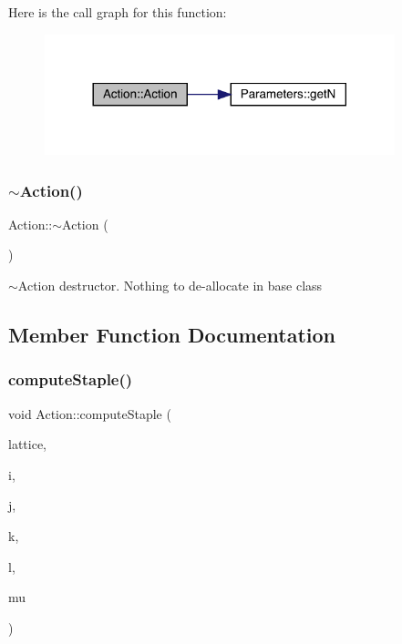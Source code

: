 Here is the call graph for this function\+:\nopagebreak
\begin{figure}[H]
\begin{center}
\leavevmode
\includegraphics[width=288pt]{class_action_a4f457ccfc8336b565cadca56b36e0271_cgraph}
\end{center}
\end{figure}
\mbox{\label{class_action_acdb06775d157339256a8ecd55749226c}} 
\subsubsection{\texorpdfstring{$\sim$Action()}{~Action()}}
{\footnotesize\ttfamily Action\+::$\sim$\+Action (\begin{DoxyParamCaption}{ }\end{DoxyParamCaption})\hspace{0.3cm}{\ttfamily [virtual]}}



$\sim$\+Action destructor. Nothing to de-\/allocate in base class 



\subsection{Member Function Documentation}
\mbox{\label{class_action_a2d5a64b47a8913955e5911ca072ff80d}} 
\subsubsection{\texorpdfstring{computeStaple()}{computeStaple()}}
{\footnotesize\ttfamily void Action\+::compute\+Staple (\begin{DoxyParamCaption}\item[{\mbox{\hyperlink{class_lattice}{Lattice}}$<$ \mbox{\hyperlink{class_s_u3}{S\+U3}} $>$ $\ast$}]{lattice,  }\item[{unsigned int}]{i,  }\item[{unsigned int}]{j,  }\item[{unsigned int}]{k,  }\item[{unsigned int}]{l,  }\item[{int}]{mu }\end{DoxyParamCaption})\hspace{0.3cm}{\ttfamily [virtual]}}



